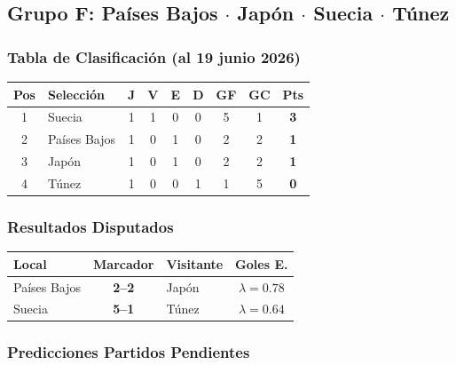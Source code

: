 \documentclass[11pt,a4paper]{article}
\begin{document}
\subsection{Grupo F: Países Bajos $\cdot$ Japón $\cdot$ Suecia $\cdot$ Túnez}

\subsubsection*{Tabla de Clasificación (al 19 junio 2026)}


\begin{center}
\begin{tabular}{@{}clccccccc@{}}
\toprule
\textbf{Pos} & \textbf{Selección} & \textbf{J} & \textbf{V} & \textbf{E} & \textbf{D} & \textbf{GF} & \textbf{GC} & \textbf{Pts} \\
\midrule
  \cellcolor{green!25}1 & \cellcolor{green!25}Suecia & 1 & 1 & 0 & 0 & 5 & 1 & \textbf{3} \\
  \cellcolor{green!25}2 & \cellcolor{green!25}Países Bajos & 1 & 0 & 1 & 0 & 2 & 2 & \textbf{1} \\
  \cellcolor{yellow!20}3 & \cellcolor{yellow!20}Japón & 1 & 0 & 1 & 0 & 2 & 2 & \textbf{1} \\
  4 & Túnez & 1 & 0 & 0 & 1 & 1 & 5 & \textbf{0} \\
\bottomrule
\end{tabular}
\end{center}

\subsubsection*{Resultados Disputados}

\begin{center}
\begin{tabular}{@{}lclc@{}}
\toprule
\textbf{Local} & \textbf{Marcador} & \textbf{Visitante} & \textbf{Goles E.} \\
\midrule
  Países Bajos & \textbf{2--2} & Japón & $\lambda=0.78$ \\
  Suecia & \textbf{5--1} & Túnez & $\lambda=0.64$ \\
\bottomrule
\end{tabular}
\end{center}

\subsubsection*{Predicciones Partidos Pendientes}
\end{document}
